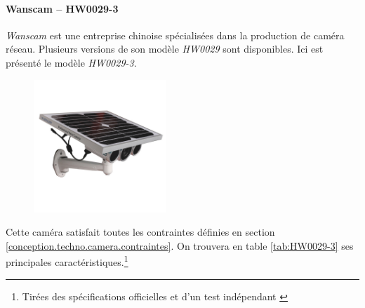 \paragraph{\textbf{Wanscam} -- HW0029-3}

\textit{Wanscam} est une entreprise chinoise spécialisées dans la production de caméra réseau. Plusieurs versions de son modèle \textit{HW0029} sont disponibles. Ici est présenté le modèle \textit{HW0029-3}. \autocite{cam:wan3}

\begin{figure}[ht]
    \includegraphics[width=50mm]{img/conception/wan3_cam.jpg}
    \centering
\end{figure}

Cette caméra satisfait toutes les contraintes définies en section \ref{conception.techno.camera.contraintes}. On trouvera en table \ref{tab:HW0029-3} ses principales caractéristiques.\footnote{Tirées des spécifications officielles \autocite{cam:wan3} et d'un test indépendant \autocite{cam:wan3-test}}

